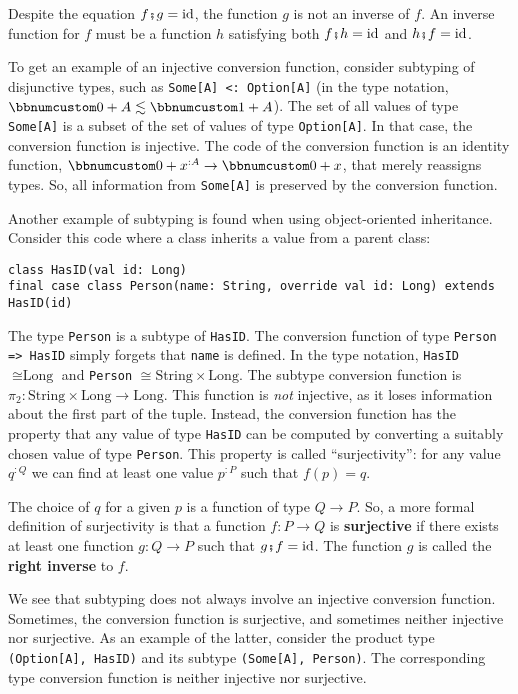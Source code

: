 Despite the equation $f\bef g=\text{id}$, the function $g$ is not
an inverse of $f$. An inverse function for
$f$ must be a function $h$ satisfying both $f\bef h=\text{id}$
and $h\bef f=\text{id}$.

To get an example of an injective conversion function, consider subtyping
of disjunctive types, such as \lstinline!Some[A] <: Option[A]! (in
the type notation, $\bbnum 0+A\lesssim\bbnum 1+A$). The set of all
values of type \lstinline!Some[A]! is a subset of the set of values
of type \lstinline!Option[A]!. In that case, the conversion function
is injective. The code of the conversion function is an identity function,
$\bbnum 0+x^{:A}\rightarrow\bbnum 0+x$, that merely reassigns types.
So, all information from \lstinline!Some[A]! is preserved by the
conversion function.

Another example of subtyping is found when using object-oriented inheritance.
Consider this code where a class inherits a value from a parent class:
\begin{lstlisting}
class HasID(val id: Long)
final case class Person(name: String, override val id: Long) extends HasID(id)
\end{lstlisting}
The type \lstinline!Person! is a subtype of \lstinline!HasID!. The
conversion function of type \lstinline!Person => HasID! simply forgets
that \lstinline!name! is defined. In the type notation, \lstinline!HasID!
$\cong\text{Long}$ and \lstinline!Person! $\cong\text{String}\times\text{Long}$.
The subtype conversion function is $\pi_{2}:\text{String}\times\text{Long}\rightarrow\text{Long}$.
This function is \emph{not} injective, as it loses information about
the first part of the tuple. Instead, the conversion function has
the property that any value of type \lstinline!HasID! can be computed
by converting a suitably chosen value of type \lstinline!Person!.
This property is called \textsf{``}surjectivity\textsf{''}: for any value $q^{:Q}$
we can find at least one value $p^{:P}$ such that $f(p)=q$. 

The choice of $q$ for a given $p$ is a function of type $Q\rightarrow P$.
So, a more formal definition of surjectivity is that a function $f:P\rightarrow Q$
is \textbf{surjective} if there exists
at least one function $g:Q\rightarrow P$ such that $g\bef f=\text{id}$.
The function $g$ is called the \textbf{right
inverse} to $f$.

We see that subtyping does not always involve an injective conversion
function. Sometimes, the conversion function is surjective, and sometimes
neither injective nor surjective. As an example of the latter, consider
the product type \lstinline!(Option[A], HasID)! and its subtype \lstinline!(Some[A], Person)!.
The corresponding type conversion function is neither injective nor
surjective. 

